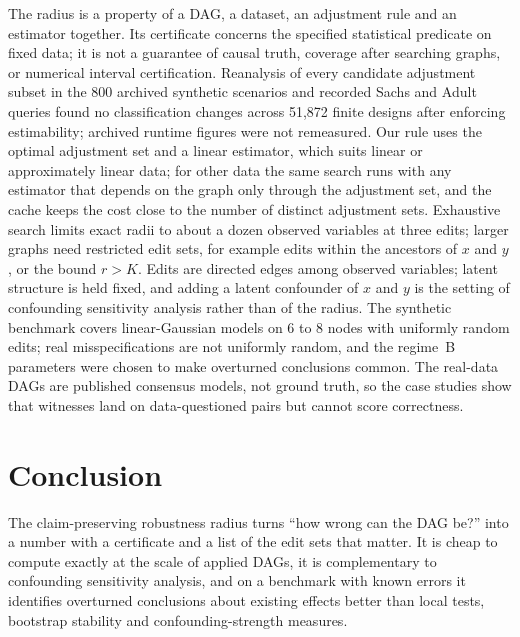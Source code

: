 \documentclass[11pt]{article}
\begin{document}
The radius is a property of a DAG, a dataset, an adjustment rule and an estimator together. Its certificate concerns the specified statistical predicate on fixed data; it is not a guarantee of causal truth, coverage after searching graphs, or numerical interval certification. Reanalysis of every candidate adjustment subset in the 800 archived synthetic scenarios and recorded Sachs and Adult queries found no classification changes across 51{,}872 finite designs after enforcing estimability; archived runtime figures were not remeasured. Our rule uses the optimal adjustment set and a linear estimator, which suits linear or approximately linear data; for other data the same search runs with any estimator that depends on the graph only through the adjustment set, and the cache keeps the cost close to the number of distinct adjustment sets. Exhaustive search limits exact radii to about a dozen observed variables at three edits; larger graphs need restricted edit sets, for example edits within the ancestors of $x$ and $y$, or the bound $r>K$. Edits are directed edges among observed variables; latent structure is held fixed, and adding a latent confounder of $x$ and $y$ is the setting of confounding sensitivity analysis rather than of the radius. The synthetic benchmark covers linear-Gaussian models on 6 to 8 nodes with uniformly random edits; real misspecifications are not uniformly random, and the regime~B parameters were chosen to make overturned conclusions common. The real-data DAGs are published consensus models, not ground truth, so the case studies show that witnesses land on data-questioned pairs but cannot score correctness.

\section{Conclusion}

The claim-preserving robustness radius turns ``how wrong can the DAG be?'' into a number with a certificate and a list of the edit sets that matter. It is cheap to compute exactly at the scale of applied DAGs, it is complementary to confounding sensitivity analysis, and on a benchmark with known errors it identifies overturned conclusions about existing effects better than local tests, bootstrap stability and confounding-strength measures.



\end{document}
